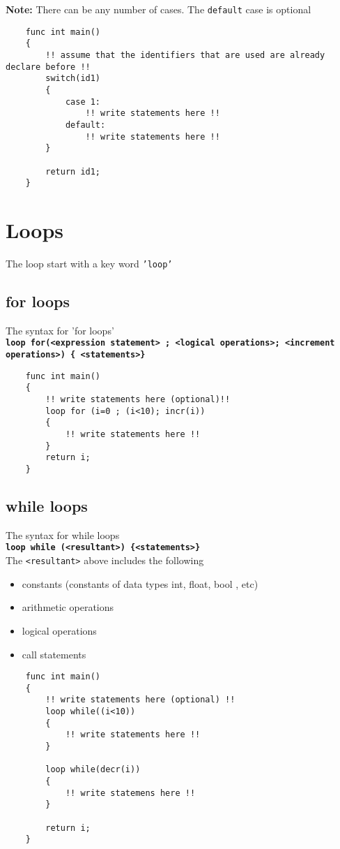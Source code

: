 \documentclass[journal, 18pt]{report}
\begin{document}
\textbf{Note:}
There can be any number of cases. The \texttt{default} case is optional
\begin{lstlisting}
    func int main()
    {
        !! assume that the identifiers that are used are already declare before !!
        switch(id1)
        {
            case 1:
                !! write statements here !!
            default:
                !! write statements here !!
        }

        return id1;
    }
\end{lstlisting}
\section{Loops}
The loop start with a key word \texttt{'loop'}
\subsection{for loops}
The syntax for 'for loops'\\
\textbf{\texttt{loop for(<expression statement> ; <logical operations>; <increment operations>) \{ <statements>\}}}
\begin{lstlisting}
    func int main()
    {
        !! write statements here (optional)!!
        loop for (i=0 ; (i<10); incr(i))
        {
            !! write statements here !!
        }
        return i;
    }
\end{lstlisting}
\subsection{while loops}
The syntax for while loops\\
\textbf{\texttt{loop while (<resultant>) \{<statements>\}}}\\
The \texttt{<resultant>} above includes the following
\begin{itemize}
    \item constants (constants of data types int, float, bool , etc)
        \item arithmetic operations
        \item logical operations
        \item call statements
\end{itemize}
\begin{lstlisting}
    func int main()
    {
        !! write statements here (optional) !!
        loop while((i<10))
        {
            !! write statements here !!
        }

        loop while(decr(i))
        {
            !! write statemens here !!
        }

        return i;
    }
\end{lstlisting}
\end{document}
